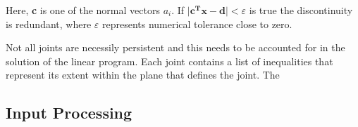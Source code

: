 Here, \textbf{c} is one of the normal vectors $a_{i}$. If $\vert \boldsymbol{c^{T} x - d} \vert < \varepsilon$ is true the discontinuity is redundant, where $\varepsilon$ represents numerical tolerance close to zero. \par

Not all joints are necessily persistent and this needs to be accounted for in the solution of the linear program. Each joint contains a list of inequalities that represent its extent within the plane that defines the joint. The 



\subsection{Input Processing}
